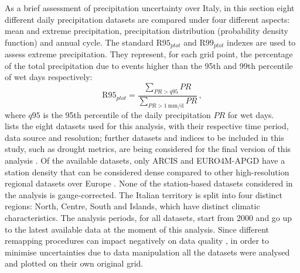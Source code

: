 As a brief assessment of precipitation uncertainty over Italy, in this section eight different daily precipitation datasets are compared under four different aspects: mean and extreme precipitation, precipitation distribution (probability density function) and annual cycle.
The standard $\textrm{R95}_{ptot}$ and $\textrm{R99}_{ptot}$ indexes are used to assess extreme precipitation.
They represent, for each grid point, the percentage of the total precipitation due to events higher than the 95th and 99th percentile of wet days respectively:
\begin{equation}
    \textrm{R95}_{ptot} = \frac{\sum_{PR > q95} PR}{\sum_{PR > \SI{1}{\milli\metre\per\day}} PR}\,,
\end{equation}\label{eq:r95}
where $q95$ is the 95th percentile of the daily precipitation $PR$ for wet days.\\
 lists the eight datasets used for this analysis, with their respective time period, data source and resolution; further datasets and indices to be included in this study, such as drought metrics, are being considered for the final version of this analysis \citep[][in preparation]{Fantini2019b}.
Of the available datasets, only ARCIS and EURO4M-APGD have a station density that can be considered dense compared to other high-resolution regional datasets over Europe \citep[see][]{Prein2017, Fantini2016}. None of the station-based datasets considered in the analysis is gauge-corrected.
The Italian territory is split into four distinct regions: North, Centre, South and Islands, which have distinct climatic characteristics.
The analysis periods, for all datasets, start from 2000 and go up to the latest available data at the moment of this analysis.
Since different remapping procedures can impact negatively on data quality \citep{Diaconescu2015}, in order to minimise uncertainties due to data manipulation all the datasets were analysed and plotted on their own original grid.
